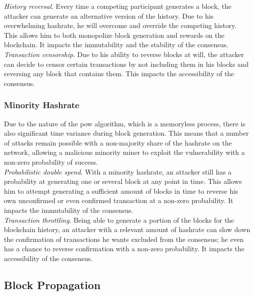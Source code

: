 \documentclass[12pt,a4paper]{article}
\begin{document}
\textit{History reversal}. Every time a competing participant generates a block, the attacker can generate an alternative version of the history. Due to his overwhelming \gls{hashrate}, he will overcome and override the competing history. This allows him to both monopolize block generation and rewards on the \gls{blockchain}. It impacts the immutability and the stability of the \gls{consensus}.\\

\textit{Transaction censorship}. Due to his ability to reverse blocks at will, the attacker can decide to censor certain \glspl{transaction} by not including them in his blocks and reversing any block that contains them. This impacts the accessibility of the \gls{consensus}.\\

\subsubsection{Minority Hashrate}

Due to the nature of the \acrshort{pow} algorithm, which is a memoryless process, there is also significant time variance during block generation. This means that a number of attacks remain possible with a non-majority share of the \gls{hashrate} on the network, allowing a malicious minority miner to exploit the vulnerability with a non-zero probability of success.\\

\textit{Probabilistic double spend}. With a minority \gls{hashrate}, an attacker still has a probability at generating one or several block at any point in time. This allows him to attempt generating a sufficient amount of blocks in time to reverse his own unconfirmed or even confirmed \gls{transaction} at a non-zero probability. It impacts the immutability of the \gls{consensus}.\\

\textit{Transaction throttling}. Being able to generate a portion of the blocks for the blockchain history, an attacker with a relevant amount of \gls{hashrate} can slow down the confirmation of \glspl{transaction} he wants excluded from the \gls{consensus}; he even has a chance to reverse confirmation with a non-zero probability. It impacts the accessibility of the \gls{consensus}.\\

\subsection{Block Propagation}
\end{document}
